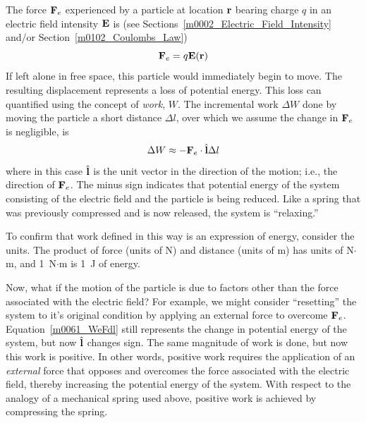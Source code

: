 

\label{m0061_Force_Energy_and_Potential_Difference} %

The force 
${\bf F}_e$ experienced by a particle at location ${\bf r}$ bearing charge $q$ in an electric field intensity ${\bf E}$ is
(see Sections~\ref{m0002_Electric_Field_Intensity} and/or Section~\ref{m0102_Coulombs_Law})
%
\begin{equation}
{\bf F}_e = q {\bf E}({\bf r})
\label{m0061_eFeqE} 
\end{equation}
%
If left alone in free space, this particle would immediately begin to move.
The resulting displacement represents a loss of potential energy. 
This loss can quantified using the concept of \emph{work}, $W$.  
The incremental work $\Delta W$ done by moving the particle a short distance $\Delta l$, over which we assume the change in ${\bf F}_e$ is negligible, is
%
\begin{equation}
\Delta W \approx -{\bf F}_e\cdot\hat{\bf l}\Delta l
\label{m0061_WeFdl}
\end{equation}
%
where in this case $\hat{\bf l}$ is the unit vector in the direction of the motion; i.e., the direction of ${\bf F}_e$.
The minus sign indicates that potential energy of the system consisting of the electric field and the particle is being reduced. 
Like a spring that was previously compressed and is now released, the system is ``relaxing.''
   
To confirm that work defined in this way is an expression of energy, consider the units. The product of force (units of N) and distance (units of m) has units of N$\cdot$m, and 1~N$\cdot$m is 1~J of energy.

Now, what if the motion of the particle is due to factors other than the force associated with the electric field?
For example, we might consider ``resetting'' the system to it's original condition by applying an external force to overcome ${\bf F}_e$.  
Equation~\ref{m0061_WeFdl} still represents the change in potential energy of the system, but now $\hat{\bf l}$ changes sign.
The same magnitude of work is done, but now this work is positive.
In other words, positive work requires the application of an \emph{external} force that opposes and overcomes the force associated with the electric field, thereby increasing the potential energy of the system.
With respect to the analogy of a mechanical spring used above, positive work is achieved by compressing the spring.

